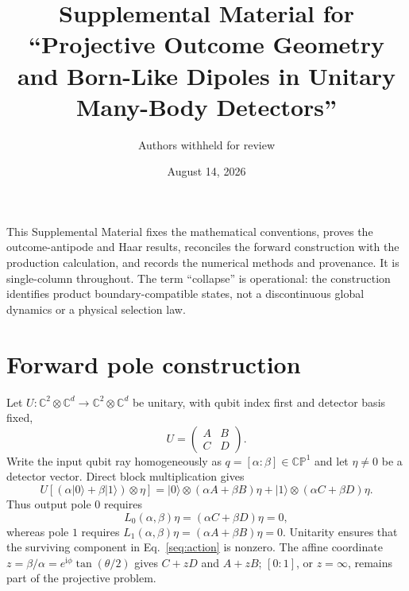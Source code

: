 \documentclass[aps,prl,onecolumn,10pt,notitlepage,superscriptaddress,nofootinbib]{revtex4-2}
\newcommand{\CP}{\mathbb{CP}}
\newcommand{\ii}{\mathrm{i}}
\begin{document}
\title{Supplemental Material for ``Projective Outcome Geometry and Born-Like Dipoles in Unitary Many-Body Detectors''}
\author{Authors withheld for review}
\date{August 14, 2026}
\maketitle

This Supplemental Material fixes the mathematical conventions, proves the outcome-antipode and Haar results, reconciles the forward construction with the production calculation, and records the numerical methods and provenance.  It is single-column throughout.  The term ``collapse'' is operational: the construction identifies product boundary-compatible states, not a discontinuous global dynamics or a physical selection law.

\section{Forward pole construction}

Let $U:\mathbb C^2\otimes\mathbb C^d\rightarrow\mathbb C^2\otimes\mathbb C^d$ be unitary, with qubit index first and detector basis fixed,
\begin{equation}
 U=\begin{pmatrix}A&B\\C&D\end{pmatrix}.                                      \label{seq:block}
\end{equation}
Write the input qubit ray homogeneously as $q=[\alpha:\beta]\in\CP^1$ and let $\eta\neq0$ be a detector vector.  Direct block multiplication gives
\begin{equation}
U[(\alpha|0\rangle+\beta|1\rangle)\otimes\eta]
=|0\rangle\otimes(\alpha A+\beta B)\eta
+|1\rangle\otimes(\alpha C+\beta D)\eta.                                   \label{seq:action}
\end{equation}
Thus output pole $0$ requires
\begin{equation}
L_0(\alpha,\beta)\eta=(\alpha C+\beta D)\eta=0,                              \label{seq:l0}
\end{equation}
whereas pole $1$ requires $L_1(\alpha,\beta)\eta=(\alpha A+\beta B)\eta=0$.  Unitarity ensures that the surviving component in Eq.~\eqref{seq:action} is nonzero.  The affine coordinate $z=\beta/\alpha=e^{\ii\phi}\tan(\theta/2)$ gives $C+zD$ and $A+zB$; $[0:1]$, or $z=\infty$, remains part of the projective problem.
\end{document}
